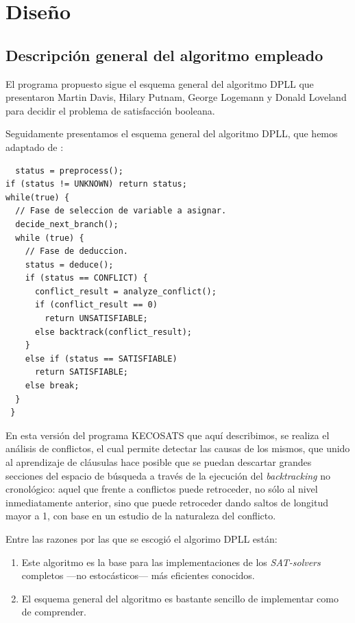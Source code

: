 \documentclass[12pt,lettersize,oneside]{article}
\begin{document}
\section{Diseño}

\subsection{Descripción general del algoritmo empleado}
El programa propuesto sigue el esquema general del algoritmo DPLL que presentaron
Martin Davis, Hilary Putnam, George Logemann y Donald Loveland para decidir el
problema de satisfacción booleana.

Seguidamente presentamos el esquema general del algoritmo DPLL, que hemos
adaptado de \cite{Zhang}:

\begin{lstlisting}
  status = preprocess(); 
if (status != UNKNOWN) return status; 
while(true) { 
  // Fase de seleccion de variable a asignar.
  decide_next_branch(); 
  while (true) { 
    // Fase de deduccion.
    status = deduce(); 
    if (status == CONFLICT) { 
      conflict_result = analyze_conflict(); 
      if (conflict_result == 0) 
        return UNSATISFIABLE; 
      else backtrack(conflict_result); 
    } 
    else if (status == SATISFIABLE) 
      return SATISFIABLE; 
    else break; 
  } 
 } 
\end{lstlisting}
\vspace{-2.5mm}

En esta versión del programa KECOSATS que aquí describimos, se realiza el
análisis de conflictos, el cual permite detectar las causas de los mismos, que
unido al aprendizaje de cláusulas hace posible que se puedan descartar grandes
secciones del espacio de búsqueda a través de la ejecución del
\emph{backtracking} no cronológico: aquel que frente a conflictos puede
retroceder, no sólo al nivel inmediatamente anterior, sino que puede retroceder
dando saltos de longitud mayor a 1, con base en un estudio de la naturaleza del
conflicto.

Entre las razones por las que se escogió el algorimo DPLL están:
\begin{enumerate}\vspace{-2.5mm}
\item Este algoritmo es la base para las implementaciones de los
  \emph{SAT-solvers} completos ---no estocásticos--- más eficientes conocidos.
\item El esquema general del algoritmo es bastante sencillo de implementar como
  de comprender.
\end{enumerate}
\end{document}
